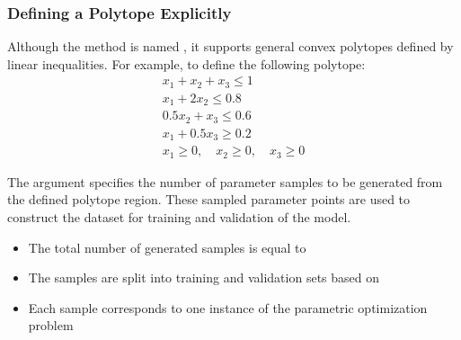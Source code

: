 \documentclass[letterpaper,10pt,english,openany,oneside]{sphinxmanual}
\begin{document}
\subsubsection{Defining a Polytope Explicitly}
\label{\detokenize{user-guide/defining-parameter-space:defining-a-polytope-explicitly}}
\sphinxAtStartPar
Although the method is named , it supports general convex polytopes defined by linear inequalities. For example, to define the following polytope:
\begin{equation*}
\begin{split}x_1 + x_2 + x_3 \le 1 \\
x_1 + 2x_2 \le 0.8 \\
0.5x_2 + x_3 \le 0.6 \\
x_1 + 0.5x_3 \ge 0.2\\
x_1 \ge 0, \quad x_2 \ge 0, \quad x_3 \ge 0\end{split}
\end{equation*}
\begin{sphinxVerbatim}[commandchars=\\\{\}]
        
                           
                            
\end{sphinxVerbatim}

\sphinxAtStartPar
The argument  specifies the number of parameter samples to be generated from the defined polytope region. These sampled parameter points are used to construct the dataset for training and validation of the model.
\begin{itemize}
\item {} 
\sphinxAtStartPar
The total number of generated samples is equal to 

\item {} 
\sphinxAtStartPar
The samples are split into training and validation sets based on 

\item {} 
\sphinxAtStartPar
Each sample corresponds to one instance of the parametric optimization problem

\end{itemize}
\end{document}
